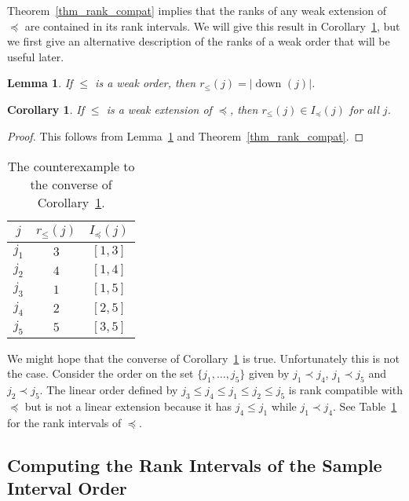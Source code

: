 \documentclass[12pt]{article}
\newcommand{\dset}[2][]{\operatorname{down}_{#1}(#2)}
\numberwithin{theorem}{section}
\newtheorem{lemma}[theorem]{Lemma}
\newtheorem{corollary}[theorem]{Corollary}
\begin{document}
Theorem~\ref{thm_rank_compat} implies that the ranks of any weak extension of $\preceq$ are contained in its rank intervals.  We will give this result in Corollary~\ref{cor_weak_ord_rank_compat}, but we first give an alternative description of the ranks of a weak order that will be useful later.

\begin{lemma}
\label{lem_weak_rank_dset}
If $\leqslant$ is a weak order, then $r_\leqslant(j) = |\dset{j}|$.
\end{lemma}

\begin{corollary}
\label{cor_weak_ord_rank_compat}
If $\leqslant$ is a weak extension of $\preceq$, then $r_\leqslant(j) \in I_\preceq(j)$ for all $j$.
\end{corollary}
\begin{proof}
This follows from Lemma~\ref{lem_weak_rank_dset} and Theorem~\ref{thm_rank_compat}.
\end{proof}

\begin{table}[t]
\centering
\begin{tabular}{|c|c|c|}
\hline
$j$&$r_\leqslant(j)$&$I_\preceq(j)$\\
\hline
$j_1$&$3$&$[1, 3]$\\
$j_2$&$4$&$[1, 4]$\\
$j_3$&$1$&$[1, 5]$\\
$j_4$&$2$&$[2, 5]$\\
$j_5$&$5$&$[3, 5]$\\
\hline
\end{tabular}
\caption{The counterexample to the converse of Corollary~\ref{cor_weak_ord_rank_compat}.}
\label{tab_rank_int_counter}
\end{table}

We might hope that the converse of Corollary~\ref{cor_weak_ord_rank_compat} is true.  Unfortunately this is not the case.  Consider the order on the set $\{j_1, \dots, j_5\}$ given by $j_1 \prec j_4$, $j_1 \prec j_5$ and $j_2 \prec j_5$.  The linear order defined by $j_3 \leqslant j_4 \leqslant j_1 \leqslant j_2 \leqslant j_5$ is rank compatible with $\preceq$ but is not a linear extension because it has $j_4 \leqslant j_1$ while $j_1 \prec j_4$.  See Table~\ref{tab_rank_int_counter} for the rank intervals of $\preceq$.

\subsection{Computing the Rank Intervals of the Sample Interval Order}
\label{subsec_rank_int_compute}
\end{document}
